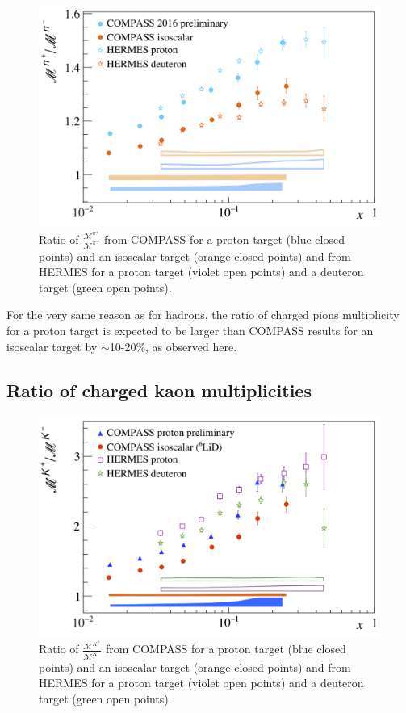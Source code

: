 \begin{figure}[!h]
  \centering
	\includegraphics[scale=0.5]{./gfx/pir.png}
	\caption{Ratio of $\frac{\mathscr{M}^{\pi^+}}{\mathscr{M}^{\pi^-}}$ from COMPASS for a proton target (blue closed points) and an isoscalar target (orange closed points) and from HERMES for a proton target (violet open points) and a deuteron target (green open points).}
	\label{pic:piratio}
\end{figure}

For the very same reason as for hadrons, the ratio of charged pions multiplicity for a proton target is expected to be larger than COMPASS results for an isoscalar target by $\sim$10-20\%, as observed here.

\subsection{Ratio of charged kaon multiplicities}

\begin{figure}[!h]
  \centering
	\includegraphics[scale=0.5]{./gfx/Kr.png}
	\caption{Ratio of $\frac{\mathscr{M}^{K^+}}{\mathscr{M}^{K^-}}$ from COMPASS for a proton target (blue closed points) and an isoscalar target (orange closed points) and from HERMES for a proton target (violet open points) and a deuteron target (green open points).}
	\label{pic:kratio}
\end{figure}

